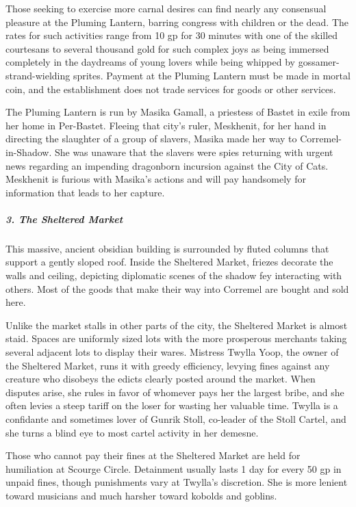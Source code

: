 \documentclass[10pt,a4paper,twoside,bg=print,twocolumn,openany,nodeprecatedcode]{dndbook}
\begin{document}
Those seeking to exercise more carnal desires can find nearly any consensual pleasure at the Pluming Lantern, barring congress with children or the dead. The rates for such activities range from 10 gp for 30 minutes with one of the skilled courtesans to several thousand gold for such complex joys as being immersed completely in the daydreams of young lovers while being whipped by gossamer-strand-wielding sprites. Payment at the Pluming Lantern must be made in mortal coin, and the establishment does not trade services for goods or other services.

The Pluming Lantern is run by Masika Gamall, a priestess of Bastet in exile from her home in Per-Bastet. Fleeing that city's ruler, Meskhenit, for her hand in directing the slaughter of a group of slavers, Masika made her way to Corremel-in-Shadow. She was unaware that the slavers were spies returning with urgent news regarding an impending dragonborn incursion against the City of Cats. Meskhenit is furious with Masika's actions and will pay handsomely for information that leads to her capture.

\subparagraph{3. The Sheltered Market}
This massive, ancient obsidian building is surrounded by fluted columns that support a gently sloped roof. Inside the Sheltered Market, friezes decorate the walls and ceiling, depicting diplomatic scenes of the shadow fey interacting with others. Most of the goods that make their way into Corremel are bought and sold here.

Unlike the market stalls in other parts of the city, the Sheltered Market is almost staid. Spaces are uniformly sized lots with the more prosperous merchants taking several adjacent lots to display their wares. Mistress Twylla Yoop, the owner of the Sheltered Market, runs it with greedy efficiency, levying fines against any creature who disobeys the edicts clearly posted around the market. When disputes arise, she rules in favor of whomever pays her the largest bribe, and she often levies a steep tariff on the loser for wasting her valuable time. Twylla is a confidante and sometimes lover of Gunrik Stoll, co-leader of the Stoll Cartel, and she turns a blind eye to most cartel activity in her demesne.

Those who cannot pay their fines at the Sheltered Market are held for humiliation at Scourge Circle. Detainment usually lasts 1 day for every 50 gp in unpaid fines, though punishments vary at Twylla's discretion. She is more lenient toward musicians and much harsher toward kobolds and goblins.
\end{document}
